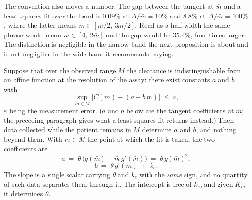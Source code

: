 The convention also moves a number. The gap between the tangent at $\bar m$ and a
least-squares fit over the band is $0.09\%$ at $\Delta/\bar m = 10\%$ and $8.8\%$ at
$\Delta/\bar m = 100\%$, where the latter means $m \in [\bar m/2,\, 3\bar m/2]$. Read as a
half-width the same phrase would mean $m \in [0,\, 2\bar m]$ and the gap would be $35.4\%$,
four times larger. The distinction is negligible in the narrow band the next proposition is
about and is not negligible in the wide band it recommends buying.

\begin{proposition}[Degeneracy]
\label{prop:degeneracy}
Suppose that over the observed range $M$ the clearance is indistinguishable from an affine
function at the resolution of the assay: there exist constants $a$ and $b$ with
\begin{equation}
\sup_{m \in M} \bigl| C(m) - (a + b\,m) \bigr| \;\le\; \varepsilon ,
\label{eq:affine}
\end{equation}
$\varepsilon$ being the measurement error. ($a$ and $b$ below are the tangent coefficients
at $\bar m$; the preceding paragraph gives what a least-squares fit returns instead.)
Then data collected while the patient remains in $M$ determine $a$ and $b$, and nothing
beyond them. With $\bar m \in M$ the point at which
the fit is taken, the two coefficients are
\begin{equation}
a \;=\; \theta\,\bigl(g(\bar m) - \bar m\, g'(\bar m)\bigr) \;=\; \theta\, g(\bar m)^2 ,
\label{eq:intercept}
\end{equation}
\begin{equation}
b \;=\; \theta\, g'(\bar m) \;+\; k_e .
\label{eq:slope}
\end{equation}
The slope is a single scalar carrying $\theta$ and $k_e$ with the \emph{same} sign, and no
quantity of such data separates them through it. The intercept is free of $k_e$, and given
$K_m$ it determines $\theta$.
\end{proposition}

